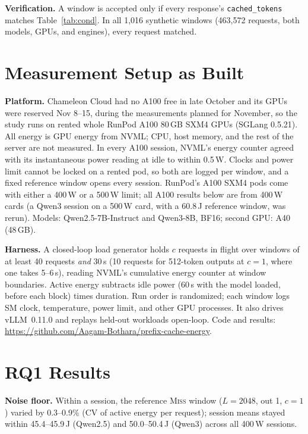 \documentclass[conference]{IEEEtran}
\begin{document}
\textbf{Verification.} A window is accepted only if every response's \texttt{cached\_tokens} matches Table~\ref{tab:cond}. In all 1{,}016 synthetic windows (463{,}572 requests, both models, GPUs, and engines), every request matched.

\section{Measurement Setup as Built}
\textbf{Platform.} Chameleon Cloud had no A100 free in late October and its GPUs were reserved Nov 8--15, during the measurements planned for November, so the study runs on rented whole RunPod A100 80\,GB SXM4 GPUs (SGLang 0.5.21). All energy is GPU energy from NVML; CPU, host memory, and the rest of the server are not measured. In every A100 session, NVML's energy counter agreed with its instantaneous power reading at idle to within 0.5\,W. Clocks and power limit cannot be locked on a rented pod, so both are logged per window, and a fixed reference window opens every session. RunPod's A100 SXM4 pods come with either a 400\,W or a 500\,W limit; all A100 results below are from 400\,W cards (a Qwen3 session on a 500\,W card, with a 60.8\,J reference window, was rerun). Models: Qwen2.5-7B-Instruct and Qwen3-8B, BF16; second GPU: A40 (48\,GB).

\textbf{Harness.} A closed-loop load generator holds $c$ requests in flight over windows of at least 40 requests \emph{and} 30\,s (10 requests for 512-token outputs at $c{=}1$, where one takes 5--6\,s), reading NVML's cumulative energy counter at window boundaries. Active energy subtracts idle power (60\,s with the model loaded, before each block) times duration. Run order is randomized; each window logs SM clock, temperature, power limit, and other GPU processes. It also drives vLLM~0.11.0 and replays held-out workloads open-loop. Code and results: \url{https://github.com/Aagam-Bothara/prefix-cache-energy}.

\section{RQ1 Results}

\textbf{Noise floor.} Within a session, the reference \textsc{Miss} window ($L{=}2048$, out 1, $c{=}1$) varied by 0.3--0.9\% (CV of active energy per request); session means stayed within 45.4--45.9\,J (Qwen2.5) and 50.0--50.4\,J (Qwen3) across all 400\,W sessions.
\end{document}
